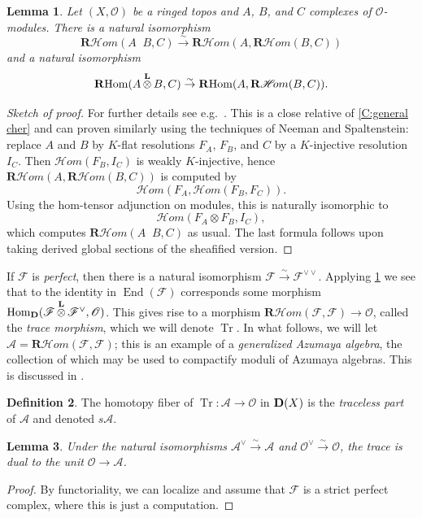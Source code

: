 \documentclass[11pt]{amsart}
\newcommand{\field}[1]{\mathbf #1}
\newcommand{\ms}[1]{\mathscr #1}
\newcommand{\simto}{\stackrel{\sim}{\to}}
\renewcommand{\hom}{\operatorname{Hom}}
\newcommand{\shom}{\ms H\!om}
\newcommand{\rshom}{\mathbf{R}\shom}
\DeclareMathOperator{\rhom}{\operatorname{{\bf R}Hom}}
\DeclareMathOperator{\D}{\operatorname{\bf D}}
\renewcommand{\[}{[\!\hspace{0.03em}[}
\renewcommand{\]}{]\!\hspace{0.03em}]}
\renewcommand{\(}{(\!\hspace{0.03em}(}
\renewcommand{\)}{)\!\hspace{0.03em})}
\DeclareMathOperator*{\tensor}{\otimes}
\DeclareMathOperator*{\ltensor}{\stackrel{\field L}{\otimes}}
\DeclareMathOperator{\Tr}{\operatorname{Tr}}
\DeclareMathOperator{\End}{\operatorname{End}}
\newtheorem{lem}{Lemma}[subsubsection]%
\theoremstyle{definition}
\newtheorem{defn}[lem]{Definition}
\theoremstyle{remark}
\begin{document}
\begin{lem}\label{L:cher a cartan revisited} Let $(X,{\ms O})$ be a ringed topos and $A$, $B$, and $C$ 
complexes of ${\ms O}$-modules.  There is a natural isomorphism
$$\rshom(A\ltensor B,C)\simto\rshom(A,\rshom(B,C))$$
and a natural isomorphism
$$\rhom(A\ltensor B,C)\simto\rhom(A,\rshom(B,C)).$$
\end{lem}
\begin{proof}[Sketch of proof]  For further details see e.g.\ \cite{spaltenstein}.  
This is a close relative of \ref{C:general cher} and 
can proven similarly using the techniques of Neeman and 
Spaltenstein: replace $A$ and $B$ by $K$-flat resolutions $F_{A}$, 
$F_{B}$, and $C$ by 
a $K$-injective resolution $I_{C}$.  Then $\shom(F_{B},I_{C})$ is weakly 
$K$-injective, hence $\rshom(A,\rshom(B,C))$ is computed by 
$$\shom(F_{A},\shom(F_{B},F_{C})).$$  Using the hom-tensor adjunction on 
modules, this is naturally isomorphic to $$\shom(F_{A}\tensor 
F_{B},I_{C}),$$ which computes $\rshom(A\ltensor B,C)$ as usual.  The 
last formula follows upon taking derived global 
sections of the sheafified version.
\end{proof}

If $\ms F$ is \emph{perfect\/}, then there is a natural isomorphism $\ms F\simto\ms 
F^{\vee\vee}$.  Applying \ref{L:cher a cartan revisited} 
we see that to the identity in $\End(\ms F)$ corresponds some morphism 
$\hom_{\D}(\ms F\ltensor\ms F^{\vee},{\ms O})$.  This gives rise to a 
morphism $\rshom(\ms F,\ms F)\to{\ms O}$, called the \emph{trace 
morphism\/}, which we will denote $\Tr$.  In what follows, we will let $\ms A=\rshom(\ms F,\ms F)$; this is an example of a \emph{generalized Azumaya algebra\/}, the collection of which may be used to compactify moduli of Azumaya algebras.  This is discussed in \cite{pgl-bundles}.

\begin{defn} The homotopy fiber of $\Tr:\ms A\to{\ms O}$ in $\D(X)$ is the 
\emph{traceless part\/} of $\ms A$ and denoted $s\ms A$.
\end{defn}

\begin{lem}\label{L:dualize me} Under the natural isomorphisms $\ms A^{\vee}\simto\ms A$ 
and ${\ms O}^{\vee}\simto{\ms O}$, the trace is dual to the unit ${\ms O}\to\ms 
A$.
\end{lem}
\begin{proof} By functoriality, we can localize and assume that $\ms 
F$ is a strict perfect complex, where this is just a computation.
\end{proof}
\end{document}
